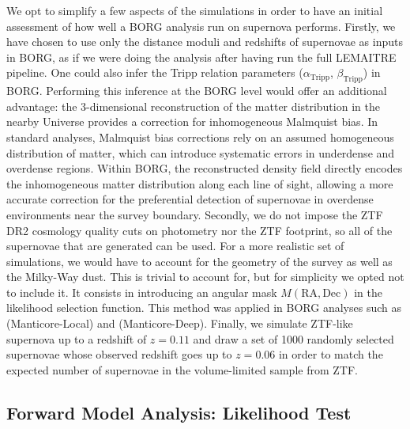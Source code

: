 We opt to simplify a few aspects of the simulations in order to have an initial assessment of how well a BORG analysis run on supernova performs. 
Firstly, we have chosen to use only the distance moduli and redshifts of supernovae as inputs in BORG, as if we were doing the analysis after having run the full 
LEMAITRE pipeline. 
One could also infer the Tripp relation parameters ($\alpha_{\text{Tripp}}$, $\beta_{\text{Tripp}}$) in BORG. 
Performing this inference at the BORG level would offer an 
additional advantage: the 3-dimensional reconstruction of the matter 
distribution in the nearby Universe provides a 
correction for inhomogeneous Malmquist bias. In standard analyses, 
Malmquist bias corrections rely on an assumed homogeneous distribution 
of matter, which can introduce systematic errors in underdense and 
overdense regions. Within BORG, the reconstructed density field 
directly encodes the inhomogeneous matter distribution along each line 
of sight, allowing a more accurate correction for the preferential 
detection of supernovae in overdense environments near the survey 
boundary.
Secondly, we do not impose the ZTF DR2 cosmology quality cuts on photometry nor the ZTF footprint, so all of the supernovae that are 
generated can be used. 
For a more realistic set of simulations, we would have to account for the geometry of the survey as well as the Milky-Way dust. This is trivial to account for, but 
for simplicity we opted not to include it. 
It consists in introducing an 
angular mask $M(\text{RA}, \text{Dec})$ in the likelihood selection function. 
This method was applied in BORG analyses such as 
\cite{Mcalpine_2025} (Manticore-Local) and \cite{Mcalpine_2026} (Manticore-Deep). 
Finally, we simulate ZTF-like supernova up to a redshift of $z=0.11$ and draw a set of 1000 randomly selected supernovae whose observed redshift goes up to $z=0.06$ in order to 
match the expected number of supernovae in the volume-limited sample from ZTF. \\

\subsection{Forward Model Analysis: Likelihood Test}

